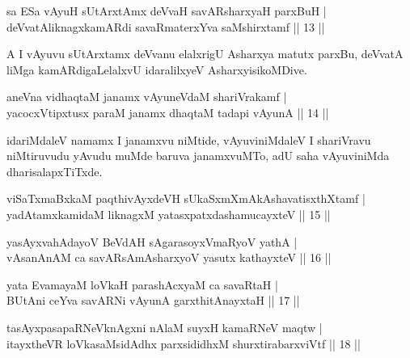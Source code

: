 
\begin{shl}
sa ESa vAyuH sUtArxtAmx deVvaH savARsharxyaH parxBuH |\\
deVvatAliknagxkamARdi savaRmaterxYva saMshirxtamf \hfill || 13 ||
\end{shl}

\begin{artha}
A I vAyuvu sUtArxtamx deVvanu elalxrigU Asharxya matutx parxBu, deVvatA liMga kamARdigaLelalxvU idaralilxyeV AsharxyisikoMDive.
\end{artha}


\begin{shl}
aneVna vidhaqtaM janamx vAyuneVdaM shariVrakamf |\\
yacocxVtipxtusx paraM janamx dhaqtaM tadapi vAyunA \hfill || 14 ||
\end{shl}

\begin{artha}
idariMdaleV namamx I janamxvu niMtide, vAyuviniMdaleV I shariVravu niMtiruvudu yAvudu muMde baruva janamxvuMTo, adU saha vAyuviniMda dharisalapxTiTxde.
\end{artha}

\begin{shl}
viSaTxmaBxkaM paqthivAyxdeVH sUkaSxmXmAkAshavatisxthXtamf |\\
yadAtamxkamidaM liknagxM yatasxpatxdashamucayxteV \hfill || 15 ||
\end{shl}

\begin{shl}
yasAyx\s \s vahAdayoV BeVdAH sAgarasoyxVmaRyoV yathA |\\
vAsanAnAM ca savARsAmAsharxyoV yasutx kathayxteV \hfill || 16 ||
\end{shl}

\begin{shl}
yata EvamayaM loVkaH parashAcxyaM ca savaRtaH |\\
BUtAni ceYva savARNi vAyunA garxthitAnayxtaH \hfill || 17 ||
\end{shl}

\begin{shl}
tasAyxpasapaRNeV\s knAgxni nAlaM suyxH kamaRNeV maqtw |\\
itayxtheVR loVkasaMsidAdhx parxsididhxM shurxtirabarxviVtf \hfill || 18 ||
\end{shl}

